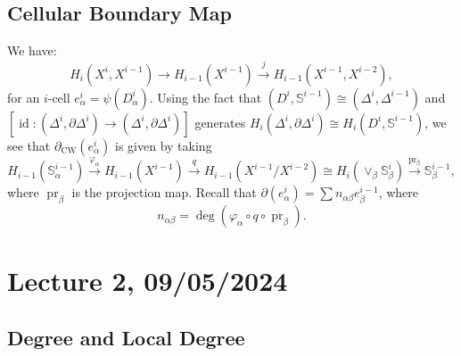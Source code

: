 \documentclass[a4paper]{report}
\theoremstyle{definition}
\theoremstyle{remark}
\theoremstyle{proposition}
\theoremstyle{conjecture}
\theoremstyle{lemma}
\theoremstyle{corollary}
\theoremstyle{exercise}
\newcommand{\on}{\operatorname}
\begin{document}
\subsection{Cellular Boundary Map}

We have:
$$H_i(X^i,X^{i-1}) \longrightarrow H_{i-1}(X^{i-1}) \stackrel{j}{\longrightarrow} H_{i-1}(X^{i-1}, X^{i-2}),$$
for an $i$-cell $e_\alpha^i = \psi(D_\alpha^i)$. Using the fact that $(D^i,\mathbb{S}^{i-1}) \cong (\Delta^i, \Delta^{i-1})$ and 
$[\on{id} : (\Delta^i,\partial\Delta^i) \to (\Delta^i, \partial\Delta^i)]$ generates 
$H_i(\Delta^i, \partial\Delta^i) \cong H_i(D^i, \mathbb{S}^{i-1})$, we see that 
$\partial_{\on{CW}}(e^i_\alpha)$ is given by taking 
$$H_{i-1}(\mathbb{S}^{i-1}_\alpha) \stackrel{\varphi_\alpha}{\longrightarrow} H_{i-1}(X^{i-1}) \stackrel{q}{\longrightarrow} H_{i-1}(X^{i-1}/X^{i-2}) \cong H_i(\vee_\beta \mathbb{S}_\beta^i) \stackrel{\on{pr_\beta}}{\longrightarrow} \mathbb{S}_\beta^{i-1},$$
where $\on{pr}_\beta$ is the projection map.
Recall that $\partial(e_\alpha^i) = \sum n_{\alpha\beta} e^{i-1}_\beta$, where 
$$n_{\alpha\beta} = \deg \left(\varphi_\alpha \circ q  \circ \on{pr}_\beta \right).$$

\section{Lecture 2, 09/05/2024}

\subsection{Degree and Local Degree}
\end{document}
